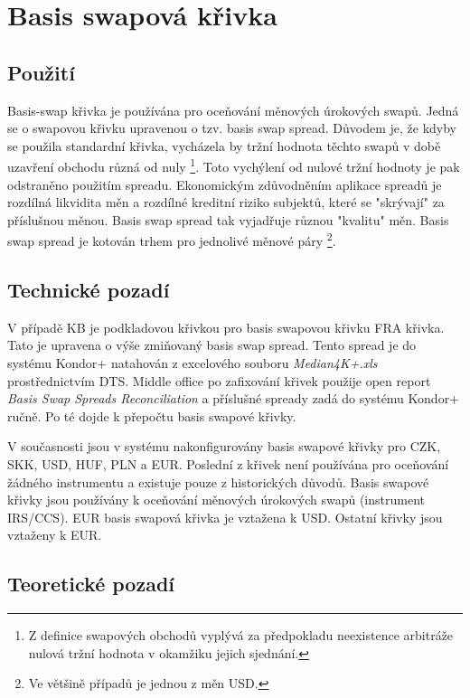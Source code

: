 \documentclass[a4paper]{book}
\begin{document}
\chapter{Basis swapová křivka}

\section{Použití}

Basis-swap křivka je používána pro oceňování měnových úrokových swapů. Jedná se o swapovou křivku upravenou o tzv. basis swap spread. Důvodem je, že kdyby se použila standardní křivka, vycházela by tržní hodnota těchto swapů v době uzavření obchodu různá od nuly \footnote{Z definice swapových obchodů vyplývá za předpokladu neexistence arbitráže nulová tržní hodnota v okamžiku jejich sjednání.}. Toto vychýlení od nulové tržní hodnoty je pak odstraněno použitím spreadu. Ekonomickým zdůvodněním aplikace spreadů je rozdílná likvidita měn a rozdílné kreditní riziko subjektů, které se "skrývají" za příslušnou měnou. Basis swap spread tak vyjadřuje různou "kvalitu" měn. Basis swap spread je kotován trhem pro jednolivé měnové páry \footnote{Ve většině případů je jednou z měn USD.}.

\section{Technické pozadí}

V případě KB je podkladovou křivkou pro basis swapovou křivku FRA křivka. Tato je upravena o výše zmiňovaný basis swap spread. Tento spread je do systému Kondor+ natahován z excelového souboru \textit{Median4K+.xls} prostřednictvím DTS. Middle office po zafixování křivek použije open report \textit{Basis Swap Spreads Reconciliation} a příslušné spready zadá do systému Kondor+ ručně. Po té dojde k přepočtu  basis swapové křivky.

V současnosti jsou v systému nakonfigurovány basis swapové křivky pro CZK, SKK, USD, HUF, PLN a EUR. Poslední z křivek není používána pro oceňování žádného instrumentu a existuje pouze z historických důvodů. Basis swapové křivky jsou používány k oceňování měnových úrokových swapů (instrument IRS/CCS). EUR basis swapová křivka je vztažena k USD. Ostatní křivky jsou vztaženy k EUR.

\section{Teoretické pozadí}
\end{document}
